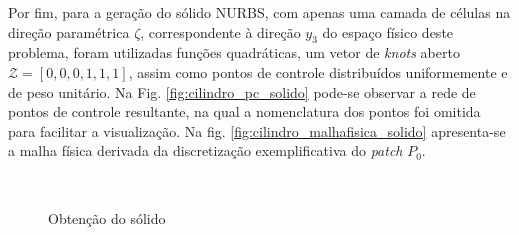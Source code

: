 \documentclass[tese_patricia]{subfiles}
\begin{document}
Por fim, para a geração do sólido NURBS, com apenas uma camada de células na direção paramétrica $\zeta$, correspondente à direção $y_3$ do espaço físico deste problema, foram utilizadas funções quadráticas, um vetor de \textit{knots} aberto $\mathcal{Z} = \left[0,0,0,1,1,1\right]$, assim como pontos de controle distribuídos uniformemente e de peso unitário. Na Fig. \ref{fig:cilindro_pc_solido} pode-se observar a rede de pontos de controle resultante, na qual a nomenclatura dos pontos foi omitida para facilitar a visualização. Na fig. \ref{fig:cilindro_malhafisica_solido} apresenta-se a malha física derivada da discretização exemplificativa do \textit{patch} $P_0$.

\begin{figure}[!t]
	\centering
	   \ \ 
	\caption{Obtenção do sólido}
	\label{fig:cilindro_geo2}
\end{figure}
\end{document}
